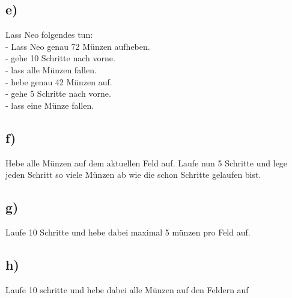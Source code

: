 \subsection*{e)}
Lass Neo folgendes tun:\\
- Lass Neo genau 72 Münzen aufheben. \\
- gehe 10 Schritte nach vorne.\\
- lass alle Münzen fallen.\\
- hebe genau 42 Münzen auf.\\
- gehe 5 Schritte nach vorne.\\
- lass eine Münze fallen.

\subsection*{f)}
Hebe alle Münzen auf dem aktuellen Feld auf. Laufe nun 5 Schritte und lege jeden Schritt so viele Münzen ab wie die schon Schritte gelaufen bist.

\subsection*{g)}
 Laufe 10 Schritte und hebe dabei maximal 5 münzen pro Feld auf.

\subsection*{h)}
Laufe 10 schritte und hebe dabei alle Münzen auf den Feldern auf
\newpage